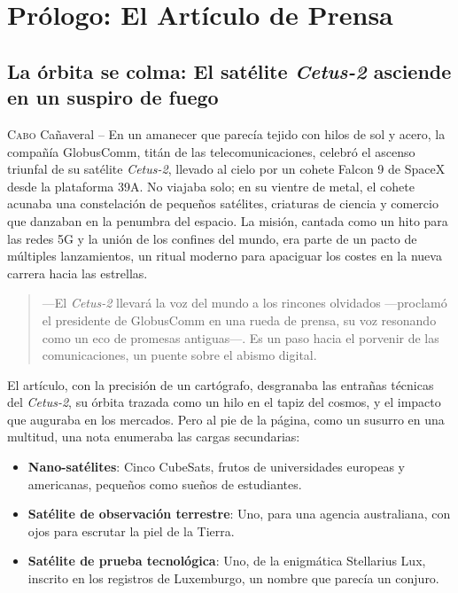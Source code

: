 \part*{Prólogo: El Artículo de Prensa}

\chapter*{La órbita se colma: El satélite \emph{Cetus-2} asciende en un suspiro de fuego}

\lettrine[lines=2, loversize=0.3, lraise=0]{C}{abo} Cañaveral -- En un amanecer que parecía tejido con hilos de sol y acero, la compañía GlobusComm, titán de las telecomunicaciones, celebró el ascenso triunfal de su satélite \emph{Cetus-2}, llevado al cielo por un cohete Falcon 9 de SpaceX desde la plataforma 39A. No viajaba solo; en su vientre de metal, el cohete acunaba una constelación de pequeños satélites, criaturas de ciencia y comercio que danzaban en la penumbra del espacio. La misión, cantada como un hito para las redes 5G y la unión de los confines del mundo, era parte de un pacto de múltiples lanzamientos, un ritual moderno para apaciguar los costes en la nueva carrera hacia las estrellas.

\begin{quote}
\calli
---El \emph{Cetus-2} llevará la voz del mundo a los rincones olvidados ---proclamó el presidente de GlobusComm en una rueda de prensa, su voz resonando como un eco de promesas antiguas---. Es un paso hacia el porvenir de las comunicaciones, un puente sobre el abismo digital.
\end{quote}

El artículo, con la precisión de un cartógrafo, desgranaba las entrañas técnicas del \emph{Cetus-2}, su órbita trazada como un hilo en el tapiz del cosmos, y el impacto que auguraba en los mercados. Pero al pie de la página, como un susurro en una multitud, una nota enumeraba las cargas secundarias:

\begin{itemize}
    \item \textbf{Nano-satélites}: Cinco CubeSats, frutos de universidades europeas y americanas, pequeños como sueños de estudiantes.
    \item \textbf{Satélite de observación terrestre}: Uno, para una agencia australiana, con ojos para escrutar la piel de la Tierra.
    \item \textbf{Satélite de prueba tecnológica}: Uno, de la enigmática Stellarius Lux, inscrito en los registros de Luxemburgo, un nombre que parecía un conjuro.
\end{itemize}

